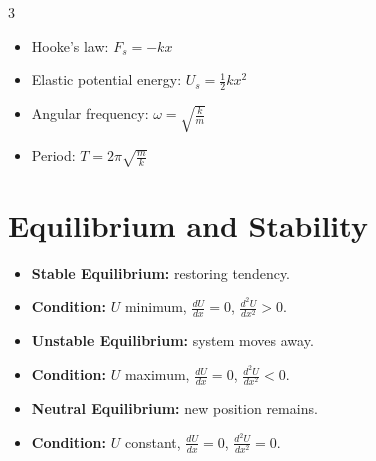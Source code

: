 \documentclass[10pt,a4paper]{article}
\newcommand{\important}[1]{\textbf{#1}}
\newcommand{\condition}[1]{\textbf{Condition:} #1}
\begin{document}
\begin{multicols}{3}
\begin{itemize}
    \item Hooke's law: \(F_s = -kx\)
    \item Elastic potential energy: \(U_s = \frac{1}{2}kx^2\)
    \item Angular frequency: \(\omega = \sqrt{\frac{k}{m}}\)
    \item Period: \(T = 2\pi\sqrt{\frac{m}{k}}\)
\end{itemize}

\section{Equilibrium and Stability}

\begin{itemize}
    \item \important{Stable Equilibrium:} restoring tendency.
    \item \condition{$U$ minimum, $\frac{dU}{dx}=0$, $\frac{d^2U}{dx^2}>0$.}
    \item \important{Unstable Equilibrium:} system moves away.
    \item \condition{$U$ maximum, $\frac{dU}{dx}=0$, $\frac{d^2U}{dx^2}<0$.}
    \item \important{Neutral Equilibrium:} new position remains.
    \item \condition{$U$ constant, $\frac{dU}{dx}=0$, $\frac{d^2U}{dx^2}=0$.}
\end{itemize}

\end{multicols}
\end{document}

